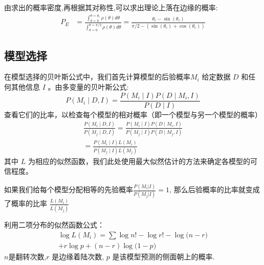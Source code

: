 \documentclass[UTF8]{gapd}
\begin{document}
由求出的概率密度,再根据其对称性,可以求出理论上落在边缘的概率:
\begin{equation}
\begin{aligned}
P_{E} &=\frac{\int_{\theta=0}^{\theta=\theta_{c}} \rho(\theta) d \theta}{\int_{\theta=0}^{\theta=\pi / 2} \rho(\theta) d \theta}
=\frac{\theta_{c}-\sin \left(\theta_{c}\right)}{\pi / 2-\left(\sin \left(\theta_{c}\right)+\cos \left(\theta_{c}\right)\right)}
\end{aligned}
\end{equation}
\subsection{模型选择}
在模型选择的贝叶斯公式中，我们首先计算模型的后验概率$M_{i}$      给定数据 $D$   和任何其他信息  $I$  。由多变量的贝叶斯公式:
\begin{equation}
P\left(M_{i} \mid D, I\right)=\frac{P\left(M_{i} \mid I\right) P\left(D \mid M_{i}, I\right)}{P(D \mid I)}
\end{equation}
查看它们的比率，以检查每个模型的相对概率（即一个模型与另一个模型的概率）
\begin{equation}
\begin{gathered}
\frac{P\left(M_{i} \mid D, I\right)}{P\left(M_{j} \mid D, I\right)}=\frac{P\left(M_{i} \mid I\right) P\left(D \mid M_{i}, I\right)}{P\left(M_{j} \mid I\right) P\left(D \mid M_{j}, I\right)} \\
=\frac{P\left(M_{i} \mid I\right) L\left(M_{i}\right)}{P\left(M_{j} \mid I\right) L\left(M_{j}\right)}
\end{gathered}
\end{equation}
其中   $L$  为相应的似然函数，我们此处使用最大似然估计的方法来确定各模型的可信程度。

如果我们给每个模型分配相等的先验概率$\frac{P(M_i|I)}{P(M_j|I)}=1$,
那么后验概率的比率就变成了概率的比率  $\frac{L(M_i)}{L(M_j)}$

利用二项分布的似然函数公式：
\begin{equation}
\begin{gathered}
\log L\left( M_i \right) =\sum{\log}n!-\log r!-\log\mathrm{(}n-r)
\\
+r\log p+(n-r)\log\mathrm{(}1-p)
\end{gathered}
\end{equation}
$n$是翻转次数,$r$    是边缘着陆次数,  $p$  是该模型预测的侧面朝上的概率.
\end{document}
